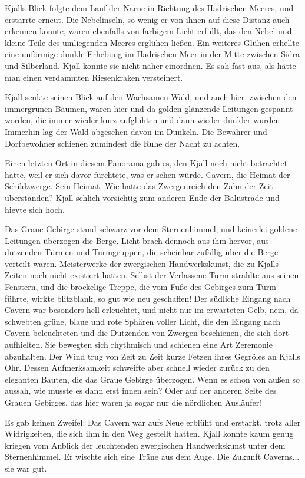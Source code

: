 Kjalls Blick folgte dem Lauf der Narne in Richtung des Hadrischen Meeres, und erstarrte erneut. Die Nebelinseln, so wenig er von ihnen auf diese Distanz auch erkennen konnte, waren ebenfalls von farbigem Licht erfüllt, das den Nebel und kleine Teile des umliegenden Meeres erglühen ließen. Ein weiteres Glühen erhellte eine unförmige dunkle Erhebung im Hadrischen Meer in der Mitte zwischen Sidra und Silberland. Kjall konnte sie nicht näher einordnen. Es sah fast aus, als hätte man einen verdammten Riesenkraken versteinert.

Kjall senkte seinen Blick auf den Wachsamen Wald, und auch hier, zwischen den immergrünen Bäumen, waren hier und da golden glänzende Leitungen gespannt worden, die immer wieder kurz aufglühten und dann wieder dunkler wurden. Immerhin lag der Wald abgesehen davon im Dunkeln. Die Bewahrer und Dorfbewohner schienen zumindest die Ruhe der Nacht zu achten.

Einen letzten Ort in diesem Panorama gab es, den Kjall noch nicht betrachtet hatte, weil er sich davor fürchtete, was er sehen würde. Cavern, die Heimat der Schildzwerge. Sein Heimat. Wie hatte das Zwergenreich den Zahn der Zeit überstanden? Kjall schlich vorsichtig zum anderen Ende der Balustrade und hievte sich hoch.

Das Graue Gebirge stand schwarz vor dem Sternenhimmel, und keinerlei goldene Leitungen überzogen die Berge. Licht brach dennoch aus ihm hervor, aus dutzenden Türmen und Turmgruppen, die scheinbar zufällig über die Berge verteilt waren. Meisterwerke der zwergischen Handwerkskunst, die zu Kjalls Zeiten noch nicht existiert hatten. Selbst der Verlassene Turm strahlte aus seinen Fenstern, und die bröckelige Treppe, die vom Fuße des Gebirges zum Turm führte, wirkte blitzblank, so gut wie neu geschaffen! Der südliche Eingang nach Cavern war besonders hell erleuchtet, und nicht nur im erwarteten Gelb, nein, da schwebten grüne, blaue und rote Sphären voller Licht, die den Eingang nach Cavern beleuchteten und die Dutzenden von Zwergen beschienen, die sich dort aufhielten. Sie bewegten sich rhythmisch und schienen eine Art Zeremonie abzuhalten. Der Wind trug von Zeit zu Zeit kurze Fetzen ihres Gegröles an Kjalls Ohr. Dessen Aufmerksamkeit schweifte aber schnell wieder zurück zu den eleganten Bauten, die das Graue Gebirge überzogen. Wenn es schon von außen so aussah, wie musste es dann erst innen sein? Oder auf der anderen Seite des Grauen Gebirges, das hier waren ja sogar nur die nördlichen Ausläufer!

Es gab keinen Zweifel: Das Cavern war aufs Neue erblüht und erstarkt, trotz aller Widrigkeiten, die sich ihm in den Weg gestellt hatten. Kjall konnte kaum genug kriegen vom Anblick der leuchtenden zwergischen Handwerkskunst unter dem Sternenhimmel. Er wischte sich eine Träne aus dem Auge. Die Zukunft Caverns... sie war gut.


